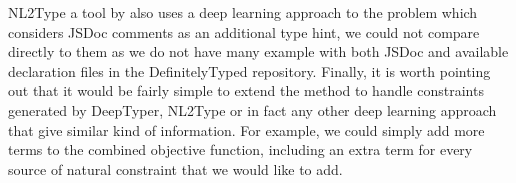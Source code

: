 \documentclass[sigplan,10pt,anonymous]{acmart} %
\newcommand{\prodts}{\textsc{ProdTS}\xspace}
\theoremstyle{plain}
\theoremstyle{remark}
\theoremstyle{definition}
\begin{document}
NL2Type a tool by \cite{malik19} also uses
a deep learning approach to the problem which considers JSDoc comments as
an additional type hint, we could not compare directly to them as
we do not have many example with both JSDoc and available declaration
files in the DefinitelyTyped repository.
Finally, it is worth pointing out that it would be fairly simple to extend the method to handle constraints generated by DeepTyper, NL2Type or
in fact any other deep learning approach that give similar kind of
information. For example, we could simply add more terms to the combined objective function, including an extra term for every source of natural constraint that we would like to add.



\end{document}
